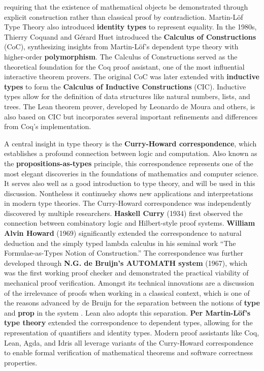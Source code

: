 requiring that the existence of mathematical 
objects be demonstrated through explicit construction rather than classical proof by contradiction. 
Martin-L\"{o}f Type Theory also introduced \textbf{identity types} to represent equality.
In the 1980s, Thierry Coquand and G\'{e}rard Huet introduced the \textbf{Calculus of Constructions} (CoC), 
synthesizing insights from Martin-L\"{o}f's dependent type theory with higher-order \textbf{polymorphism}. 
The Calculus of Constructions served as the theoretical foundation for the Coq proof assistant, 
one of the most influential interactive theorem provers.
The original CoC was later extended with \textbf{inductive types} to form the 
\textbf{Calculus of Inductive Constructions} (CIC). Inductive types allow for the definition 
of data structures like natural numbers, lists, and trees. 
The Lean theorem prover, developed by Leonardo de Moura and others, is also based on CIC 
but incorporates several important refinements and differences from Coq's implementation. 

A central insight in type theory is the \textbf{Curry-Howard correspondence}, 
which establishes a profound connection between logic and computation. 
Also known as the \textbf{propositions-as-types} principle, this correspondence 
represents one of the most elegant discoveries in the foundations 
of mathematics and computer science.
It serves also well as a good introduction to type theory, and will be used in this discussion.
Nontheless it continuelsy shows new applications and interpretations in modern type theories.
The Curry-Howard correspondence was independently discovered by multiple researchers.
\textbf{Haskell Curry} (1934) first observed the connection between combinatory logic and 
Hilbert-style proof systems.
\textbf{William Alvin Howard} (1969) significantly extended the correspondence to natural deduction 
and the simply typed lambda calculus in his seminal work ``The Formulae-as-Types Notion of Construction.'' 
The correspondence was further developed through \textbf{N.G. de Bruijn's AUTOMATH system} (1967), 
which was the first working proof checker and demonstrated the practical viability of mechanical 
proof verification. Amongst its technical innovations are a discussion of the
irrelevance of proofs when working in a classical context, which is one
of the reasons advanced by de Bruijn for the separation between the notions of 
\textbf{type} and \textbf{prop} in the system \cite{thompson1999types}. Lean also adopts this separation.
\textbf{Per Martin-L\"{o}f's type theory} extended the correspondence to
dependent types, allowing for the representation of quantifiers and identity types.
Modern proof assistants like Coq, Lean, Agda, and Idris all leverage 
variants of the Curry-Howard correspondence to enable formal verification of mathematical theorems 
and software correctness properties.

